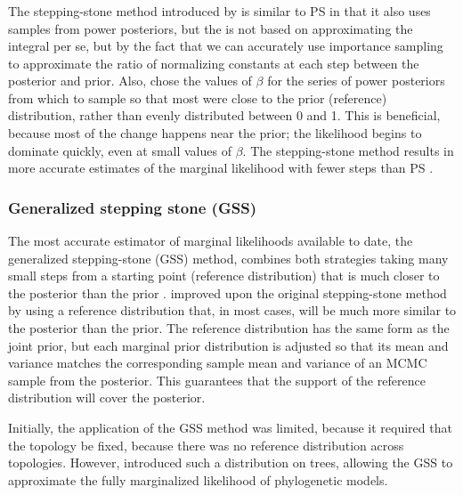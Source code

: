 \subsubsection{}
The stepping-stone method introduced by \citet{Xie2011}
is similar to PS in that it also uses samples from power posteriors, but the
 is not based on approximating the integral per se, but by
the fact that we can accurately use importance sampling to approximate the
ratio of normalizing constants  at each step between the posterior and prior.
Also, \citet{Xie2011} chose the values of $\beta$ for the
series of power posteriors from which to sample so that most were close to
the prior (reference) distribution, rather than evenly distributed between
0 and 1.
This is beneficial, because most of the change happens near the prior; the
likelihood begins to dominate quickly, even at small values of $\beta$.
The stepping-stone method results in more accurate estimates of the marginal
likelihood with fewer steps than PS \citep{Xie2011}.

\subsubsection{Generalized stepping stone (GSS)}
The most accurate estimator of marginal likelihoods available to date, the
generalized stepping-stone (GSS) method, combines both strategies
taking many small steps from a starting point (reference distribution) that
is much closer to the posterior than the prior \citep{Fan2011}.
\citet{Fan2011} improved upon the original stepping-stone
method by using a reference distribution that, in most cases, will be much more
similar to the posterior than the prior.
The reference distribution has the same form as the joint prior, but each
marginal prior distribution is adjusted so that its mean and variance matches
the corresponding sample mean and variance of an MCMC sample from the
posterior.
This guarantees that the support of the reference distribution will cover the
posterior.

Initially, the application of the GSS method was limited, because it required
that the topology be fixed, because there was no reference distribution across
topologies.
However, \citet{Holder2014} introduced such a distribution
on trees, allowing the GSS to approximate the fully marginalized likelihood of
phylogenetic models.

